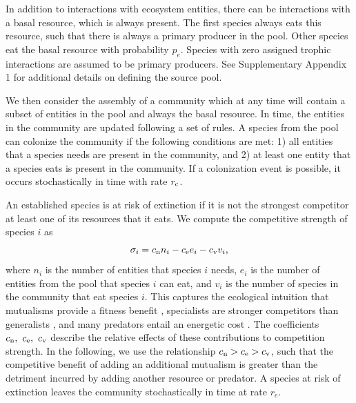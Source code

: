 \documentclass[twocolumn,preprintnumbers,amsmath,amssymb,superscriptaddress,linenumbers]{revtex4-1}
\newcommand{\rr}[1]{{\rm #1}}
\begin{document}
{  In addition to interactions with ecosystem entities, there can be interactions with a basal resource, which is always present.
  The first species always eats this resource, such that there is always a primary producer in the pool.
  Other species eat the basal resource with probability $p_e$.
  Species with zero assigned trophic interactions are assumed to be primary producers.
  See Supplementary Appendix 1 for additional details on defining the source pool.

  We then consider the assembly of a community which at any time will contain a subset of entities in the pool and always the basal resource.
  In time, the entities in the community are updated following a set of rules.
  A species from the pool can colonize the community if the following conditions are met:
  1) all entities that a species needs are present in the community, and
  2) at least one entity that a species eats is present in the community.
  If a colonization event is possible, it occurs stochastically in time with rate $r_\rr{c}$.

  An established species is at risk of extinction if it is not the strongest competitor at least one of its resources that it eats.
  We compute the competitive strength of species $i$ as
  \begin{equation}
    \sigma_i = c_\rr{n} n_i - c_\rr{e} e_i - c_\rr{v} v_i,
  \end{equation}
  where $n_i$ is the number of entities that species $i$ needs, $e_i$ is the number of entities from the pool that species $i$ can eat, and $v_i$ is the number of species in the community that eat species $i$.
  This captures the ecological intuition that mutualisms provide a fitness benefit \cite{Bronstein1994}, specialists are stronger competitors than generalists \cite{Futuyma1988}, and many predators entail an energetic cost \cite{Brown1994}.
  The coefficients $c_\rr{n},~c_\rr{e},~c_\rr{v}$ describe the relative effects of these contributions to competition strength.
  In the following, we use the relationship $c_\rr{n} > c_\rr{e} > c_\rr{v}$, such that the competitive benefit of adding an additional mutualism is greater than the detriment incurred by adding another resource or predator.
  A species at risk of extinction leaves the community stochastically in time at rate $r_e$.

}
\end{document}
